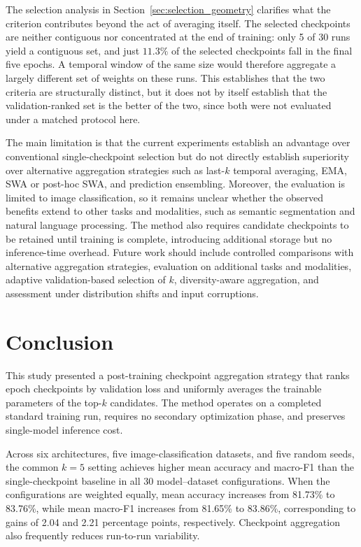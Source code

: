\documentclass[runningheads]{llncs}
\begin{document}
The selection analysis in Section~\ref{sec:selection_geometry} clarifies what
the criterion contributes beyond the act of averaging itself. The selected
checkpoints are neither contiguous nor concentrated at the end of training:
only 5 of 30 runs yield a contiguous set, and just $11.3\%$ of the selected
checkpoints fall in the final five epochs. A temporal window of the same size
would therefore aggregate a largely different set of weights on these runs.
This establishes that the two criteria are structurally distinct, but it does
not by itself establish that the validation-ranked set is the better of the
two, since both were not evaluated under a matched protocol here.

The main limitation is that the current experiments establish an advantage
over conventional single-checkpoint selection but do not directly establish
superiority over alternative aggregation strategies such as last-$k$
temporal averaging, EMA, SWA or post-hoc SWA, and prediction ensembling.
Moreover, the evaluation is limited to image classification, so it remains
unclear whether the observed benefits extend to other tasks and modalities,
such as semantic segmentation and natural language processing. The method
also requires candidate checkpoints to be retained until training is
complete, introducing additional storage but no inference-time overhead.
Future work should include controlled comparisons with alternative
aggregation strategies, evaluation on additional tasks and modalities,
adaptive validation-based selection of $k$, diversity-aware aggregation,
and assessment under distribution shifts and input corruptions.

\section{Conclusion}
\label{sec:conclusion}

This study presented a post-training checkpoint aggregation strategy that
ranks epoch checkpoints by validation loss and uniformly averages the
trainable parameters of the top-$k$ candidates. The method operates on a
completed standard training run, requires no secondary optimization phase,
and preserves single-model inference cost.

Across six architectures, five image-classification datasets, and five
random seeds, the common $k=5$ setting achieves higher mean accuracy and
macro-F1 than the single-checkpoint baseline in all 30 model--dataset
configurations. When the configurations are weighted equally, mean accuracy
increases from 81.73\% to 83.76\%, while mean macro-F1 increases from
81.65\% to 83.86\%, corresponding to gains of 2.04 and 2.21 percentage
points, respectively. Checkpoint aggregation also frequently reduces
run-to-run variability.
\end{document}
